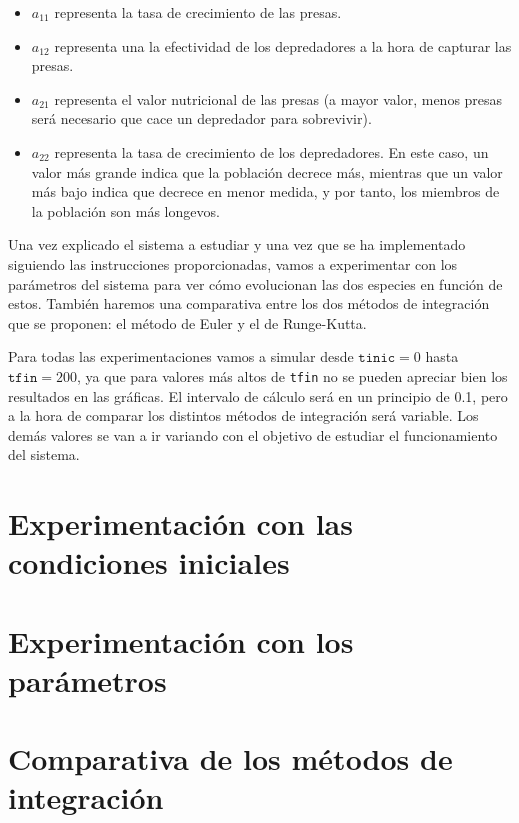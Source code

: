\documentclass[11pt,a4paper]{article}
\begin{document}
\begin{itemize}[label=\textbullet]
	\item $a_{11}$ representa la tasa de crecimiento de las presas.
	\item $a_{12}$ representa una la efectividad de los depredadores a la hora de
	capturar las presas.
	\item $a_{21}$ representa el valor nutricional de las presas (a mayor valor, menos
	presas será necesario que cace un depredador para sobrevivir).
	\item $a_{22}$ representa la tasa de crecimiento de los depredadores. En este caso,
	un valor más grande indica que la población decrece más, mientras que un valor más
	bajo indica que decrece en menor medida, y por tanto, los miembros de la población
	son más longevos.
\end{itemize}

Una vez explicado el sistema a estudiar y una vez que se ha implementado siguiendo
las instrucciones proporcionadas, vamos a experimentar con los parámetros del sistema
para ver cómo evolucionan las dos especies en función de estos. También haremos
una comparativa entre los dos métodos de integración que se proponen: el método de Euler
y el de Runge-Kutta.

Para todas las experimentaciones vamos a simular desde $\texttt{tinic} = 0$ hasta $\texttt{tfin} = 200$,
ya que para valores más altos de \texttt{tfin} no se pueden apreciar bien
los resultados en las gráficas. El intervalo de cálculo será en un principio de 0.1, pero a la hora
de comparar los distintos métodos de integración será variable. Los demás valores se van
a ir variando con el objetivo de estudiar el funcionamiento del sistema.

\section{Experimentación con las condiciones iniciales}



\section{Experimentación con los parámetros}

\section{Comparativa de los métodos de integración}
\end{document}
